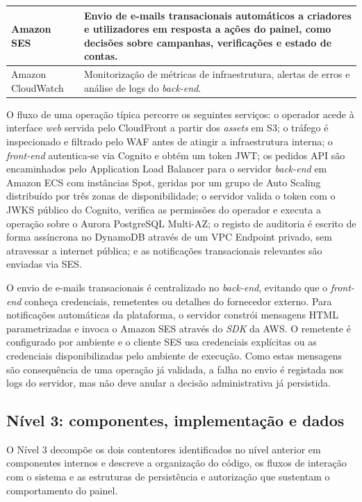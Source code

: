 \begin{table}[H]
\begin{center}
\begin{tabular}{|l|p{9cm}|}
Amazon SES            & Envio de e-mails transacionais automáticos a criadores e utilizadores em resposta a ações do painel, como decisões sobre campanhas, verificações e estado de contas. \\ \hline
Amazon CloudWatch     & Monitorização de métricas de infraestrutura, alertas de erros e análise de logs do \textit{back-end}. \\ \hline
\end{tabular}
\end{center}
\end{table}

O fluxo de uma operação típica percorre os seguintes serviços: o operador acede à interface \textit{web} servida pelo CloudFront a partir dos \textit{assets} em S3; o tráfego é inspecionado e filtrado pelo \gls{WAF} antes de atingir a infraestrutura interna; o \textit{front-end} autentica-se via Cognito e obtém um token JWT; os pedidos \gls{API} são encaminhados pelo Application Load Balancer para o servidor \textit{back-end} em Amazon ECS com instâncias Spot, geridas por um grupo de Auto Scaling distribuído por três zonas de disponibilidade; o servidor valida o token com o \gls{JWKS} público do Cognito, verifica as permissões do operador e executa a operação sobre o Aurora PostgreSQL Multi-AZ; o registo de auditoria é escrito de forma assíncrona no DynamoDB através de um VPC Endpoint privado, sem atravessar a internet pública; e as notificações transacionais relevantes são enviadas via SES.

O envio de e-mails transacionais é centralizado no \textit{back-end}, evitando que o \textit{front-end} conheça credenciais, remetentes ou detalhes do fornecedor externo. Para notificações automáticas da plataforma, o servidor constrói mensagens HTML parametrizadas e invoca o Amazon SES através do \textit{SDK} da AWS. O remetente é configurado por ambiente e o cliente SES usa credenciais explícitas ou as credenciais disponibilizadas pelo ambiente de execução. Como estas mensagens são consequência de uma operação já validada, a falha no envio é registada nos logs do servidor, mas não deve anular a decisão administrativa já persistida.

\subsection{Nível 3: componentes, implementação e dados}

O Nível 3 decompõe os dois contentores identificados no nível anterior em componentes internos e descreve a organização do código, os fluxos de interação com o sistema e as estruturas de persistência e autorização que sustentam o comportamento do painel.

